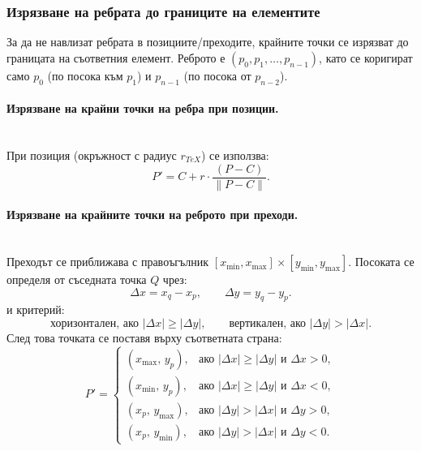 \subsubsection{Изрязване на ребрата до границите на елементите}
\hspace*{2.5em}За да не навлизат ребрата в позициите/преходите, крайните точки се изрязват до границата на съответния елемент. Реброто е \((p_0, p_1, \dots, p_{n-1})\), като се коригират само \(p_0\) (по посока към \(p_1\)) и \(p_{n-1}\) (по посока от \(p_{n-2}\)).

\paragraph{Изрязване на крайни точки на ребра при позиции.}
\mbox{}\\
При позиция (окръжност с радиус \(r_{\textit{TeX}}\)) се използва:
\begin{equation}
P' = C + r \cdot \frac{(P - C)}{\lVert P - C \rVert}.
\label{eq:clip-circle}
\end{equation}

\paragraph{Изрязване на крайните точки на реброто при преходи.}
\mbox{}\\
Преходът се приближава с правоъгълник \([x_{\min},x_{\max}] \times [y_{\min},y_{\max}]\). Посоката се определя от съседната точка \(Q\) чрез:
\begin{equation}
\Delta x = x_q - x_p,\qquad \Delta y = y_q - y_p.
\label{eq:deltas}
\end{equation}
и критерий:
\begin{equation}
\text{хоризонтален, ако } |\Delta x| \ge |\Delta y|,\qquad
\text{вертикален, ако } |\Delta y| > |\Delta x|.
\label{eq:dominant-dir}
\end{equation}
След това точката се поставя върху съответната страна:
\begin{equation}
P'=
\begin{cases}
(x_{\max},\,y_p), & \text{ако } |\Delta x|\ge|\Delta y| \text{ и } \Delta x>0,\\
(x_{\min},\,y_p), & \text{ако } |\Delta x|\ge|\Delta y| \text{ и } \Delta x<0,\\
(x_p,\,y_{\max}), & \text{ако } |\Delta y|>|\Delta x| \text{ и } \Delta y>0,\\
(x_p,\,y_{\min}), & \text{ако } |\Delta y|>|\Delta x| \text{ и } \Delta y<0.
\end{cases}
\label{eq:rect-clip}
\end{equation}

